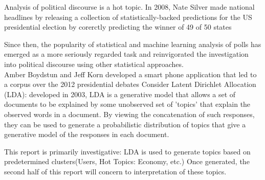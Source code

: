 Analysis of political discourse is a hot topic. In 2008, Nate Silver made national headlines by releasing a collection of statistically-backed predictions for the US presidential election by corerctly predicting the winner of 49 of 50 states \cite{Silver} 

Since then, the popularity of statistical and machine learning analysis of polls has emerged as a more seriously regarded task and reinvigorated the investigation into political discourse using other statistical approaches.\\

Amber Boydstun and Jeff Korn developed a smart phone application that led to a corpus over the 2012 presidential debates\cite{Boydstun}
Consider Latent Dirichlet Allocation (LDA): developed in 2003, LDA is a generative model that allows a set of documents to be explained by some unobserved set of 'topics' that explain the observed words in a document. By viewing the concatenation of such responses, they can be used to generate a probabilistic distribution of topics that give a generative model of the responses in each document.

This report is primarily investigative: LDA is used to generate topics based on predetermined clusters(Users, Hot Topics: Economy, etc.) Once generated, the second half of this report will concern to interpretation of these topics.